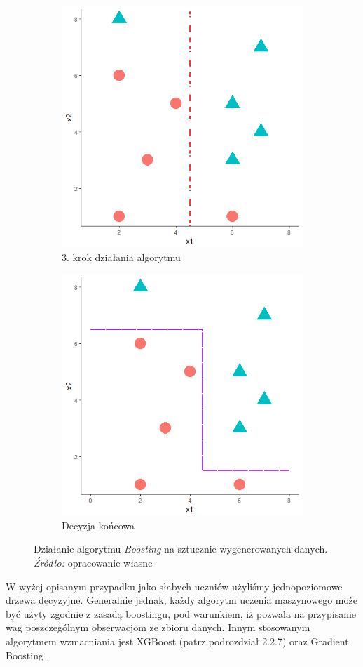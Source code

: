 \documentclass[12pt,a4paper,twoside,openany]{book}
\begin{document}
\begin{figure}[ht]
\begin{subfigure}[b]{0.5\linewidth}
    \centering
    \includegraphics[width=0.75\linewidth]{./rys005c} 
    \caption{3. krok działania algorytmu} 
    \label{rys005c} 
  \end{subfigure}%
  \begin{subfigure}[b]{0.5\linewidth}
    \centering
    \includegraphics[width=0.75\linewidth]{./rys005d} 
    \caption{Decyzja końcowa} 
    \label{rys005d} 
  \end{subfigure} 
  \caption{Działanie algorytmu \textit{Boosting} na sztucznie wygenerowanych danych. \textit{Źródło:} opracowanie własne}
  \label{fig7} 
\end{figure}

W wyżej opisanym przypadku jako słabych uczniów użyliśmy jednopoziomowe drzewa decyzyjne. Generalnie jednak, każdy algorytm uczenia maszynowego może być użyty zgodnie z zasadą boostingu, pod warunkiem, iż pozwala na przypisanie wag poszczególnym obserwacjom ze zbioru danych. Innym stosowanym algorytmem wzmacniania jest XGBoost (patrz podrozdział 2.2.7) oraz Gradient Boosting \citep{friedman2001}.
\end{document}
